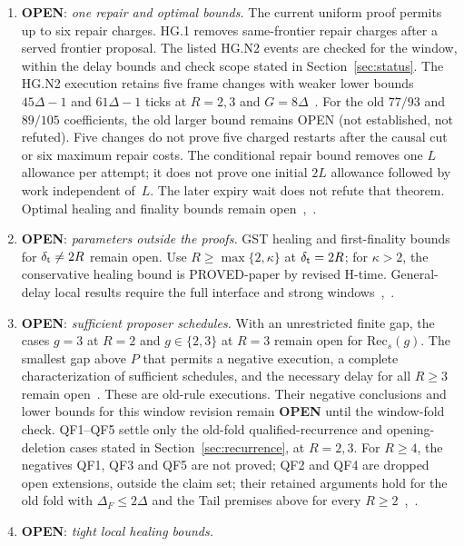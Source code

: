 \documentclass{article}
\theoremstyle{plain}
\theoremstyle{definition}
\theoremstyle{remark}
\newcommand{\OPEN}{\textbf{OPEN}}
\begin{document}
\begin{enumerate}[leftmargin=*]
\item \OPEN: \emph{one repair and optimal bounds.}
  The current uniform proof permits up to six repair charges.
  HG.1 removes same-frontier repair charges after a served frontier
  proposal. The listed HG.N2 events are checked for the window, within
  the delay bounds and check scope stated in Section~\ref{sec:status}.
  The HG.N2 execution retains five frame
  changes with weaker lower bounds $45\Delta-1$ and $61\Delta-1$ ticks
  at $R=2,3$ and $G=8\Delta$~\cite[HG.N2]{BPH}.  For the old
  $77/93$ and $89/105$ coefficients, the old larger bound remains OPEN
  (not established, not refuted).  Five changes do not prove five charged
  restarts after the causal cut or six maximum repair costs.
  The conditional repair bound removes one $L$ allowance per attempt;
  it does not prove one initial $2L$ allowance followed by work
  independent of~$L$.  The later expiry wait does not refute that
  theorem.  Optimal healing and finality bounds remain
  open~\cite[\S11, O.2]{BPH},~\cite[\S9]{BPF}.
\item \OPEN: \emph{parameters outside the proofs.}  GST healing and
  first-finality bounds for $\delta_{\rm t}\neq2R$ remain open.
  Use $R\geq\max\{2,\kappa\}$ at $\delta_{\rm t}=2R$; for $\kappa>2$,
  the conservative healing bound is PROVED-paper by revised H-time.
  General-delay local results require the full interface and strong
  windows~\cite[H.21--H.22]{BPH},~\cite[\S6]{BPF}.
\item \OPEN: \emph{sufficient proposer schedules.}
  With an unrestricted finite gap, the cases $g=3$ at $R=2$ and
  $g\in\{2,3\}$ at $R=3$ remain open for $\mathrm{Rec}_{s}(g)$.
  The smallest gap above $P$ that permits a negative execution,
  a complete characterization of sufficient schedules, and the
  necessary delay for all $R\geq3$ remain open~\cite[\S9, N5]{BPF}.
  These are old-rule executions.  Their negative conclusions and lower
  bounds for this window revision remain \OPEN{} until the window-fold check.
  QF1--QF5 settle only the old-fold qualified-recurrence and opening-deletion
  cases stated in Section~\ref{sec:recurrence}, at $R=2,3$.  For
  $R\geq4$, the negatives QF1, QF3 and QF5 are not proved; QF2 and QF4
  are dropped open extensions, outside the claim set; their retained arguments hold for the old fold with $\Delta_F\leq2\Delta$ and the Tail premises
  above for every $R\geq2$~\cite[\S9]{BPF},~\cite{NRB,NRBC}.
\item \OPEN: \emph{tight local healing bounds.}

\end{enumerate}
\end{document}
